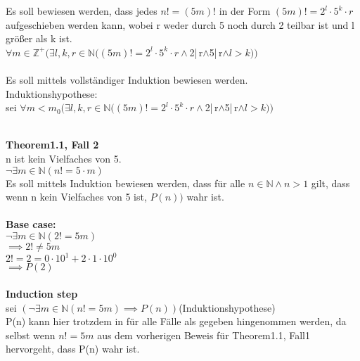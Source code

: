 \documentclass[12pt, letterpaper]{article}
\begin{document}
Es soll bewiesen werden, dass jedes $n! = (5m)!$ in der Form $(5m)! =2^{l}\cdot 5^{k}\cdot r $ aufgeschieben werden kann, wobei r weder durch 5 noch durch 2 teilbar ist und l größer als k ist.\\
$\forall m \in \mathbb{Z}^{+}(\exists l, k, r \in \mathbb{N}((5m)! = 2^{l}\cdot 5^{k}\cdot r \land $2\hspace{-0.4em}\not\hspace{0.025em}|\,r$
\land $5\hspace{-0.4em}\not\hspace{0.025em}|\,r$\land l>k
))$
\\\\
Es soll mittels vollständiger Induktion bewiesen werden.\\
Induktionshypothese:\\ sei 
$\forall m <m_{0}(\exists l, k, r \in \mathbb{N}((5m)! = 2^{l}\cdot 5^{k}\cdot r \land $2\hspace{-0.4em}\not\hspace{0.025em}|\,r$
\land $5\hspace{-0.4em}\not\hspace{0.025em}|\,r$\land l>k
))$

\\
\newpage
\textbf{Theorem1.1, Fall 2} \\

n ist kein Vielfaches von 5.\\
$\neg \exists m \in \mathbb{N}(n! = 5\cdot  m)$\\
Es soll mittels Induktion bewiesen werden, dass für alle $n\in \mathbb{N} \land n>1$ gilt, dass wenn n kein Vielfaches von 5 ist, $P(n))$  wahr ist.\\\\\textbf{Base case:} \\
$\neg \exists m \in \mathbb{N}(2! = 5m)$\\
$\implies 2! \neq 5m$\\
$2! = 2 =0\cdot 10^{1} +2\cdot 1\cdot 10^{0}$\\
$\implies P(2)$\\
\\\textbf{Induction step}\\
sei $(\neg \exists m\in \mathbb{N}(n! = 5m) \implies P(n))$(Induktionshypothese)\\

P(n) kann hier trotzdem in für alle Fälle als gegeben hingenommen werden, da selbst wenn $n! = 5m$ aus dem vorherigen Beweis für Theorem1.1, Fall1 hervorgeht, dass P(n) wahr ist.\\
\end{document}
